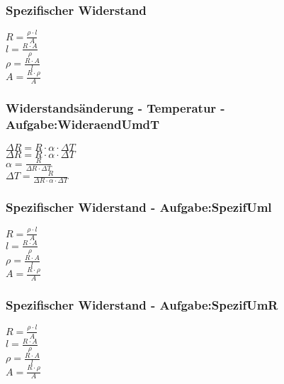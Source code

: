 \subsubsection{Spezifischer Widerstand} 
\begin{minipage}{0.45\textwidth} 
$ R = \frac{\rho \cdot l}{ A} $\\ 
$ l = \frac{R\cdot A}{ \rho } $\\ 
$ \rho  = \frac{R\cdot A}{ l} $\\ 
$ A = \frac{R\cdot \rho }{ A} $\\ 
\end{minipage} 
\begin{minipage}{0.45\textwidth} 
 
\end{minipage} 
\subsubsection{Widerstandsänderung - Temperatur - Aufgabe:WideraendUmdT} 
\begin{minipage}{0.45\textwidth} 
$ \Delta R = R\cdot \alpha \cdot \Delta T $\\ 
$ \Delta R = R\cdot \alpha \cdot \Delta T $\\ 
$ \alpha  = \frac{R}{\Delta R\cdot \Delta T} $\\ 
$ \Delta T = \frac{   R}{\Delta R\cdot \alpha \cdot \Delta T} $\\ 
\end{minipage} 
\begin{minipage}{0.45\textwidth} 
 
\end{minipage} 
\subsubsection{Spezifischer Widerstand - Aufgabe:SpezifUml} 
\begin{minipage}{0.45\textwidth} 
$ R = \frac{\rho \cdot l}{ A} $\\ 
$ l = \frac{R\cdot A}{ \rho } $\\ 
$ \rho  = \frac{R\cdot A}{ l} $\\ 
$ A = \frac{R\cdot \rho }{ A} $\\ 
\end{minipage} 
\begin{minipage}{0.45\textwidth} 
 
\end{minipage} 
\subsubsection{Spezifischer Widerstand - Aufgabe:SpezifUmR} 
\begin{minipage}{0.45\textwidth} 
$ R = \frac{\rho \cdot l}{ A} $\\ 
$ l = \frac{R\cdot A}{ \rho } $\\ 
$ \rho  = \frac{R\cdot A}{ l} $\\ 
$ A = \frac{R\cdot \rho }{ A} $\\ 
\end{minipage} 
\begin{minipage}{0.45\textwidth} 
 
\end{minipage} 
